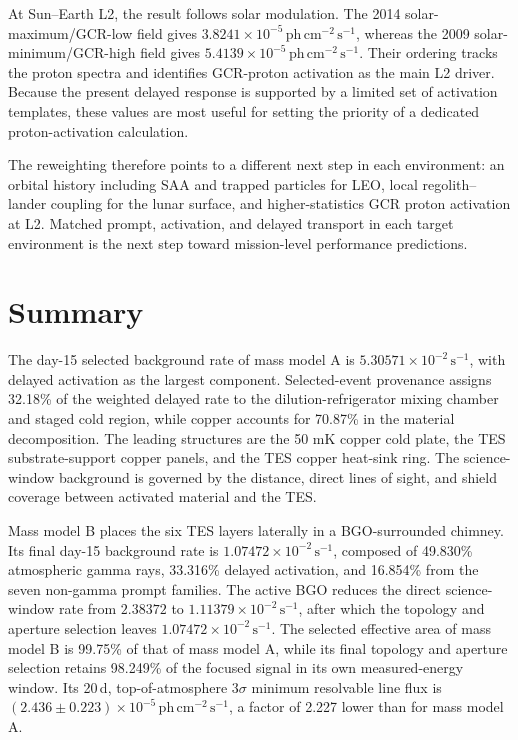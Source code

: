\documentclass[11pt]{article}
\newcommand{\revblue}[1]{\textcolor{revisionblue}{#1}}
\newcommand{\phcms}{\ensuremath{\,\mathrm{ph\,cm^{-2}\,s^{-1}}}}
\newcommand{\cps}{\ensuremath{\,\mathrm{s^{-1}}}}
\begin{document}
At Sun--Earth L2, the result follows solar modulation. The 2014
solar-maximum/GCR-low field gives $3.8241\times10^{-5}\phcms$, whereas the 2009
solar-minimum/GCR-high field gives $5.4139\times10^{-5}\phcms$. Their ordering
tracks the proton spectra and identifies GCR-proton activation as the main L2
driver. Because the present delayed response is supported by a limited set of
activation templates, these values are most useful for setting the priority of
a dedicated proton-activation calculation.

The reweighting therefore points to a different next step in each environment:
an orbital history including SAA and trapped particles for LEO, local
regolith--lander coupling for the lunar surface, and higher-statistics GCR
proton activation at L2. Matched prompt, activation, and delayed transport in
each target environment is the next step toward mission-level performance
predictions.

\FloatBarrier

\section{Summary}
\label{sec:summary}

The day-15 selected background rate of mass model A is
$5.30571\times10^{-2}\cps$, with delayed activation as the largest component.
Selected-event provenance assigns 32.18\% of the weighted delayed rate to the
dilution-refrigerator mixing chamber and staged cold region, while copper
accounts for 70.87\% in the \revblue{material decomposition}. The leading structures are the
50 mK copper cold plate, the TES substrate-support copper panels, and the TES
copper heat-sink ring. \revblue{The science-window background is governed by the
distance, direct lines of sight, and shield coverage between activated material
and the TES.}

Mass model B places the six TES layers laterally in a BGO-surrounded chimney.
Its final day-15 background rate is $1.07472\times10^{-2}\cps$, composed of
49.830\% \revblue{atmospheric gamma rays}, 33.316\% delayed activation, and
16.854\% from the seven non-gamma prompt families. The active BGO reduces the
direct science-window rate from $2.38372$ to
$1.11379\times10^{-2}\cps$, after which the topology and aperture selection
leaves $1.07472\times10^{-2}\cps$. The selected effective area of mass model B
is 99.75\% of that of mass model A, while its final topology and aperture
selection retains 98.249\% of the focused signal in its own measured-energy
window. Its 20\,d, top-of-atmosphere $3\sigma$ minimum resolvable line flux is
$(2.436\pm0.223)\times10^{-5}\phcms$, a factor of 2.227 lower than for mass
model A.
\end{document}
